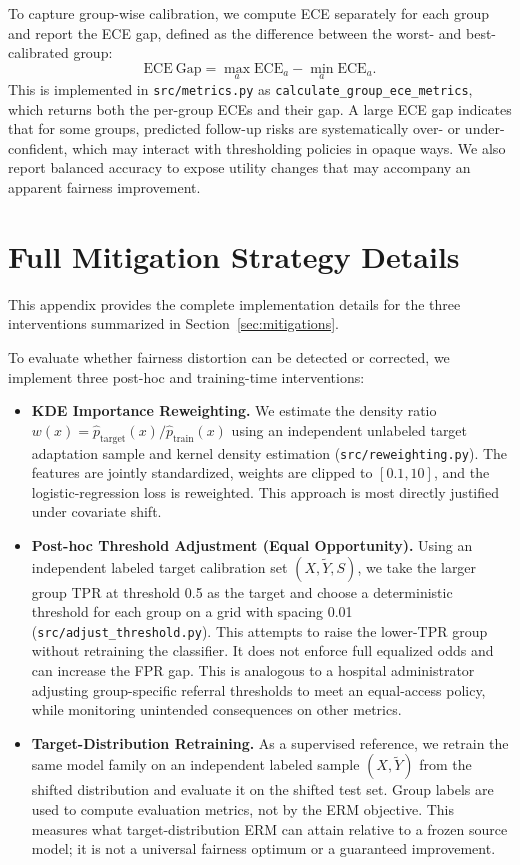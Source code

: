 \documentclass[11pt, letterpaper]{article}
\begin{document}
To capture group-wise calibration, we compute ECE separately for each group and report the ECE gap, defined as the difference between the worst- and best-calibrated group:
\[
    \mathrm{ECE\ Gap}
    = \max_{a} \mathrm{ECE}_a - \min_{a} \mathrm{ECE}_a.
\]
This is implemented in \texttt{src/metrics.py} as \texttt{calculate\_group\_ece\_metrics}, which returns both the per-group ECEs and their gap. A large ECE gap indicates that for some groups, predicted follow-up risks are systematically over- or under-confident, which may interact with thresholding policies in opaque ways. We also report balanced accuracy to expose utility changes that may accompany an apparent fairness improvement.

\section{Full Mitigation Strategy Details}
\label{app:c}

This appendix provides the complete implementation details for the three interventions summarized in Section~\ref{sec:mitigations}.

To evaluate whether fairness distortion can be detected or corrected, we implement three post-hoc and training-time interventions:

\begin{itemize}
    \item \textbf{KDE Importance Reweighting.} We estimate the density ratio
    \(w(x)=\hat{p}_{\text{target}}(x)/\hat{p}_{\text{train}}(x)\) using an independent unlabeled target adaptation sample and kernel density estimation (\texttt{src/reweighting.py}). The features are jointly standardized, weights are clipped to \([0.1,10]\), and the logistic-regression loss is reweighted. This approach is most directly justified under covariate shift.

    \item \textbf{Post-hoc Threshold Adjustment (Equal Opportunity).} Using an independent labeled target calibration set $(X,\tilde{Y},S)$, we take the larger group TPR at threshold 0.5 as the target and choose a deterministic threshold for each group on a grid with spacing 0.01 (\texttt{src/adjust\_threshold.py}). This attempts to raise the lower-TPR group without retraining the classifier. It does not enforce full equalized odds and can increase the FPR gap. This is analogous to a hospital administrator adjusting group-specific referral thresholds to meet an equal-access policy, while monitoring unintended consequences on other metrics.

    \item \textbf{Target-Distribution Retraining.} As a supervised reference, we retrain the same model family on an independent labeled sample $(X,\tilde{Y})$ from the shifted distribution and evaluate it on the shifted test set. Group labels are used to compute evaluation metrics, not by the ERM objective. This measures what target-distribution ERM can attain relative to a frozen source model; it is not a universal fairness optimum or a guaranteed improvement.
\end{itemize}
\end{document}
